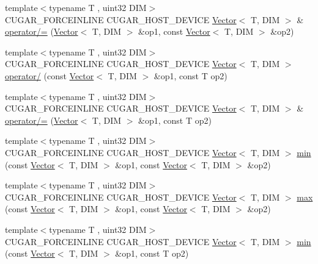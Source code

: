 \begin{DoxyCompactItemize}
\item 
{\footnotesize template$<$typename T , uint32 D\+IM$>$ }\\C\+U\+G\+A\+R\+\_\+\+F\+O\+R\+C\+E\+I\+N\+L\+I\+NE C\+U\+G\+A\+R\+\_\+\+H\+O\+S\+T\+\_\+\+D\+E\+V\+I\+CE \hyperlink{structcugar_1_1_vector}{Vector}$<$ T, D\+IM $>$ \& \hyperlink{group___vectors_module_ga8b304f19895e1b31e9e736dcad94f019}{operator/=} (\hyperlink{structcugar_1_1_vector}{Vector}$<$ T, D\+IM $>$ \&op1, const \hyperlink{structcugar_1_1_vector}{Vector}$<$ T, D\+IM $>$ \&op2)
\item 
{\footnotesize template$<$typename T , uint32 D\+IM$>$ }\\C\+U\+G\+A\+R\+\_\+\+F\+O\+R\+C\+E\+I\+N\+L\+I\+NE C\+U\+G\+A\+R\+\_\+\+H\+O\+S\+T\+\_\+\+D\+E\+V\+I\+CE \hyperlink{structcugar_1_1_vector}{Vector}$<$ T, D\+IM $>$ \hyperlink{group___vectors_module_ga70b345927dd31af9708e03dbc2ebac67}{operator/} (const \hyperlink{structcugar_1_1_vector}{Vector}$<$ T, D\+IM $>$ \&op1, const T op2)
\item 
{\footnotesize template$<$typename T , uint32 D\+IM$>$ }\\C\+U\+G\+A\+R\+\_\+\+F\+O\+R\+C\+E\+I\+N\+L\+I\+NE C\+U\+G\+A\+R\+\_\+\+H\+O\+S\+T\+\_\+\+D\+E\+V\+I\+CE \hyperlink{structcugar_1_1_vector}{Vector}$<$ T, D\+IM $>$ \& \hyperlink{group___vectors_module_ga8da7e747d2c0fc0217e1a63fbad736d7}{operator/=} (\hyperlink{structcugar_1_1_vector}{Vector}$<$ T, D\+IM $>$ \&op1, const T op2)
\item 
{\footnotesize template$<$typename T , uint32 D\+IM$>$ }\\C\+U\+G\+A\+R\+\_\+\+F\+O\+R\+C\+E\+I\+N\+L\+I\+NE C\+U\+G\+A\+R\+\_\+\+H\+O\+S\+T\+\_\+\+D\+E\+V\+I\+CE \hyperlink{structcugar_1_1_vector}{Vector}$<$ T, D\+IM $>$ \hyperlink{group___vectors_module_ga3a4f9cfc19b6a9b9a476fff354cecd59}{min} (const \hyperlink{structcugar_1_1_vector}{Vector}$<$ T, D\+IM $>$ \&op1, const \hyperlink{structcugar_1_1_vector}{Vector}$<$ T, D\+IM $>$ \&op2)
\item 
{\footnotesize template$<$typename T , uint32 D\+IM$>$ }\\C\+U\+G\+A\+R\+\_\+\+F\+O\+R\+C\+E\+I\+N\+L\+I\+NE C\+U\+G\+A\+R\+\_\+\+H\+O\+S\+T\+\_\+\+D\+E\+V\+I\+CE \hyperlink{structcugar_1_1_vector}{Vector}$<$ T, D\+IM $>$ \hyperlink{group___vectors_module_ga2aa072c8b0380f4f584c73c56b082c6c}{max} (const \hyperlink{structcugar_1_1_vector}{Vector}$<$ T, D\+IM $>$ \&op1, const \hyperlink{structcugar_1_1_vector}{Vector}$<$ T, D\+IM $>$ \&op2)
\item 
{\footnotesize template$<$typename T , uint32 D\+IM$>$ }\\C\+U\+G\+A\+R\+\_\+\+F\+O\+R\+C\+E\+I\+N\+L\+I\+NE C\+U\+G\+A\+R\+\_\+\+H\+O\+S\+T\+\_\+\+D\+E\+V\+I\+CE \hyperlink{structcugar_1_1_vector}{Vector}$<$ T, D\+IM $>$ \hyperlink{group___vectors_module_ga0946d89b855556e55e6712de6c8117f7}{min} (const \hyperlink{structcugar_1_1_vector}{Vector}$<$ T, D\+IM $>$ \&op1, const T op2)

\end{DoxyCompactItemize}
